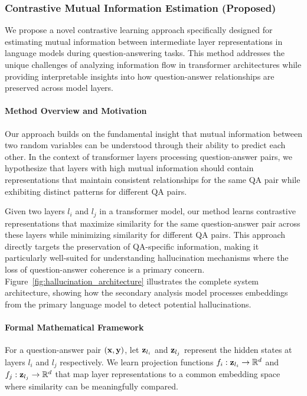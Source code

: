 \subsubsection{Contrastive Mutual Information Estimation (Proposed)}

We propose a novel contrastive learning approach specifically designed for estimating mutual information between intermediate layer representations in language models during question-answering tasks. This method addresses the unique challenges of analyzing information flow in transformer architectures while providing interpretable insights into how question-answer relationships are preserved across model layers.

\paragraph{Method Overview and Motivation}

Our approach builds on the fundamental insight that mutual information between two random variables can be understood through their ability to predict each other. In the context of transformer layers processing question-answer pairs, we hypothesize that layers with high mutual information should contain representations that maintain consistent relationships for the same QA pair while exhibiting distinct patterns for different QA pairs.

Given two layers $l_i$ and $l_j$ in a transformer model, our method learns contrastive representations that maximize similarity for the same question-answer pair across these layers while minimizing similarity for different QA pairs. This approach directly targets the preservation of QA-specific information, making it particularly well-suited for understanding hallucination mechanisms where the loss of question-answer coherence is a primary concern. Figure~\ref{fig:hallucination_architecture} illustrates the complete system architecture, showing how the secondary analysis model processes embeddings from the primary language model to detect potential hallucinations.

\paragraph{Formal Mathematical Framework}

For a question-answer pair $({\mathbf{x}}, {\mathbf{y}})$, let ${\mathbf{z}}_{l_i}$ and ${\mathbf{z}}_{l_j}$ represent the hidden states at layers $l_i$ and $l_j$ respectively. We learn projection functions $f_i: {\mathbf{z}}_{l_i} \rightarrow \mathbb{R}^d$ and $f_j: {\mathbf{z}}_{l_j} \rightarrow \mathbb{R}^d$ that map layer representations to a common embedding space where similarity can be meaningfully compared.

